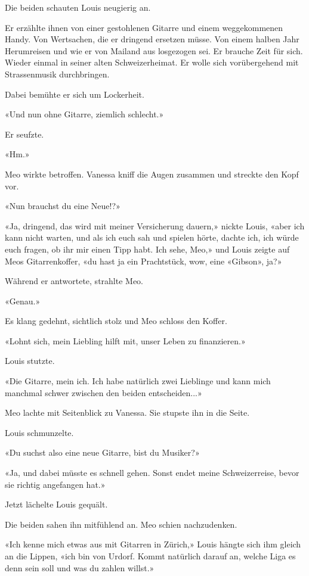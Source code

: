 Die beiden schauten Louis neugierig an.

Er erzählte ihnen von einer gestohlenen Gitarre und einem weggekommenen
Handy. Von Wertsachen, die er dringend ersetzen müsse. Von einem halben
Jahr Herumreisen und wie er von Mailand aus losgezogen sei. Er brauche
Zeit für sich. Wieder einmal in seiner alten Schweizerheimat. Er wolle
sich vorübergehend mit Strassenmusik durchbringen.

Dabei bemühte er sich um Lockerheit.

«Und nun ohne Gitarre, ziemlich schlecht.»

Er seufzte.

«Hm.»

Meo wirkte betroffen. Vanessa kniff die Augen zusammen und streckte den
Kopf vor.

«Nun brauchst du eine Neue!?»

«Ja, dringend, das wird mit meiner Versicherung dauern,» nickte Louis,
«aber ich kann nicht warten, und als ich euch sah und spielen hörte,
dachte ich, ich würde euch fragen, ob ihr mir einen Tipp habt. Ich sehe,
Meo,» und Louis zeigte auf Meos Gitarrenkoffer, «du hast ja ein
Prachtstück, wow, eine «Gibson», ja?»

Während er antwortete, strahlte Meo.

«Genau.»

Es klang gedehnt, sichtlich stolz und Meo schloss den Koffer.

«Lohnt sich, mein Liebling hilft mit, unser Leben zu finanzieren.»

Louis stutzte.

«Die Gitarre, mein ich. Ich habe natürlich zwei Lieblinge und kann mich
manchmal schwer zwischen den beiden entscheiden...»

Meo lachte mit Seitenblick zu Vanessa. Sie stupste ihn in die Seite.

Louis schmunzelte.

«Du suchst also eine neue Gitarre, bist du Musiker?»

«Ja, und dabei müsste es schnell gehen. Sonst endet meine
Schweizerreise, bevor sie richtig angefangen hat.»

Jetzt lächelte Louis gequält.

Die beiden sahen ihn mitfühlend an. Meo schien nachzudenken.

«Ich kenne mich etwas aus mit Gitarren in Zürich,» Louis hängte sich ihm
gleich an die Lippen, «ich bin von Urdorf. Kommt natürlich darauf an,
welche Liga es denn sein soll und was du zahlen willst.»

